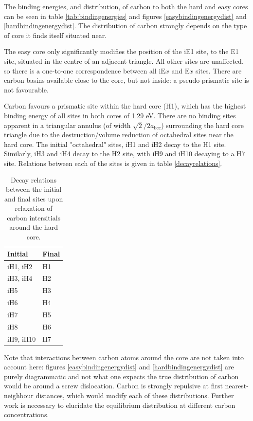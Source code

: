 \documentclass[a4paper,11pt]{article}
\begin{document}
The binding energies, and distribution, of carbon to both the hard and easy cores can be seen in
table \ref{tab:bindingenergies} and figures \ref{easybindingenergydist} and
\ref{hardbindingenergydist}. The distribution of carbon strongly depends on the type of core it
finds itself situated near.

The easy core only significantly modifies the position of the iE1 site, to the E1 site, situated
in the centre of an adjacent triangle. All other sites are unaffected, so there is a one-to-one
correspondence between all \(\text{iE}x\) and \(\text{E}x\) sites. There are carbon basins available
close to the core, but not inside: a pseudo-prismatic site is not favourable.

Carbon favours a prismatic site within the hard core (H1), which has the highest
binding energy of all sites in both cores of 1.29 eV. There are no binding sites apparent in a triangular
annulus (of width \(\sqrt{2}/2 a_{\text{bcc}}\)) surrounding the hard core triangle due to the
destruction/volume reduction of octahedral sites near the hard core. The initial "octahedral"
sites, iH1 and iH2 decay to the H1 site. Similarly, iH3 and iH4 decay to the H2 site, with iH9
and iH10 decaying to a H7 site. Relations between each of the sites is given in table
\ref{decayrelations}.

\begin{table}[htbp]
\caption{\label{tab:org987ec02}
Decay relations between the initial and final sites upon relaxation of carbon intersitials around the hard core.}
\centering
\begin{tabular}{ll}
Initial & Final\\
\hline
iH1, iH2 & H1\\
iH3, iH4 & H2\\
iH5 & H3\\
iH6 & H4\\
iH7 & H5\\
iH8 & H6\\
iH9, iH10 & H7\\
\end{tabular}
\end{table}


Note that interactions between carbon atoms around the core are not taken into account here:
figures \ref{easybindingenergydist} and \ref{hardbindingenergydist} are purely diagrammatic and not
what one expects the true distribution of carbon would be around a screw dislocation. Carbon is strongly
repulsive at first nearest-neighbour distances, which would modify each of these
distributions. Further work is necessary to elucidate the equilibrium distribution at different
carbon concentrations. 
\end{document}
